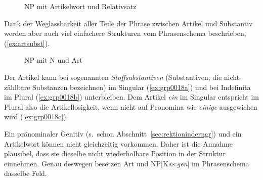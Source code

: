 \begin{figure}
  \centering
  \caption{NP mit Artikelwort und Relativsatz}
  \label{fig:grp7000}
\end{figure}

Dank der Weglassbarkeit aller Teile der Phrase zwischen Artikel und Substantiv werden aber auch viel einfachere Strukturen vom Phrasenschema beschrieben, \zB (\ref{ex:artsubst}).

\begin{exe}
\end{exe}

\begin{figure}
  \centering
  \caption{NP mit N und Art}
  \label{fig:artsubst}
\end{figure}


Der Artikel kann bei sogenannten \textit{Stoffsubstantiven} (Substantiven, die nicht-zählbare Substanzen bezeichnen) im Singular (\ref{ex:grp0018a}) und bei Indefinita im Plural (\ref{ex:grp0018b}) unterbleiben.
Dem Artikel \textit{ein} im Singular entspricht im Plural also die Artikellosigkeit, wenn nicht auf Pronomina wie \textit{einige} ausgewichen wird (\ref{ex:grp0018c}).

\begin{exe}
  \ex\label{ex:grp0018} 
  \begin{xlist}
  \end{xlist}
\end{exe}

Ein pränominaler Genitiv (s.\ schon Abschnitt~\ref{sec:rektioninderngr}) und ein Artikelwort können nicht gleichzeitig vorkommen.
Daher ist die Annahme plausibel, dass sie dieselbe nicht wiederholbare Position in der Struktur einnehmen.
Genau deswegen besetzen Art und NP[\textsc{Kas}:\textit{gen}] im Phrasenschema dasselbe Feld.

